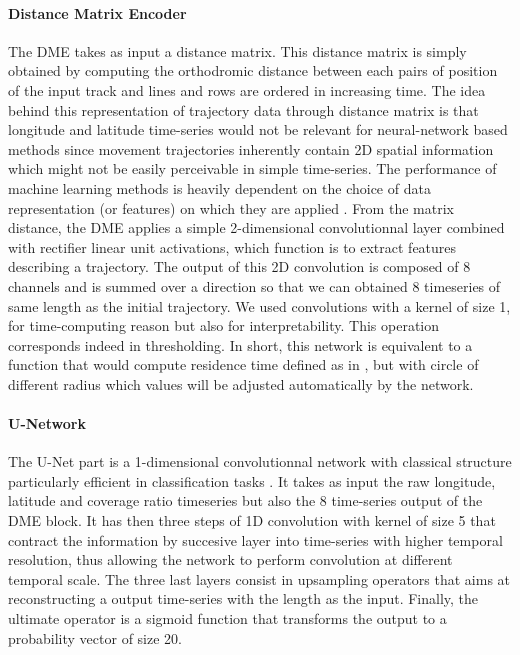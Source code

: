 \documentclass{article}
\begin{document}
\paragraph{Distance Matrix Encoder}
The DME takes as input a distance matrix.
This distance matrix is simply obtained by computing the orthodromic distance between each pairs of position of the input track and lines and rows are ordered in increasing time.
The idea behind this representation of trajectory data through distance matrix is that longitude and latitude time-series would not be relevant for neural-network based methods since movement trajectories inherently contain 2D spatial information which might not be easily perceivable in simple time-series.
The performance of machine learning methods is heavily dependent on the choice of data representation (or features) on which they are applied \cite{bengio_representation_2014}.
From the matrix distance, the DME applies a simple 2-dimensional convolutionnal layer combined with rectifier linear unit activations, which function is to extract features describing a trajectory.
The output of this 2D convolution is composed of 8 channels and is summed over a direction so that we can obtained 8 timeseries of same length as the initial trajectory.
We used convolutions with a kernel of size 1, for time-computing reason but also for interpretability. This operation corresponds indeed in thresholding.
In short, this network is equivalent to a function that would compute residence time defined as in \cite{barraquand_animal_2008}, but with circle of different radius which values will be adjusted automatically by the network.

\paragraph{U-Network}
The U-Net part is a 1-dimensional convolutionnal network with classical structure particularly efficient in classification tasks \cite{ronneberger_u-net_2015}.
It takes as input the raw longitude, latitude and coverage ratio timeseries but also the 8 time-series output of the DME block.
It has then three steps of 1D convolution with kernel of size 5 that contract the information by succesive layer into time-series with higher temporal resolution, thus allowing the network to perform convolution at different temporal scale.
The three last layers consist in upsampling operators that aims at reconstructing a output time-series with the length as the input.
Finally, the ultimate operator is a sigmoid function that transforms the output to a probability vector of size 20.
\end{document}
